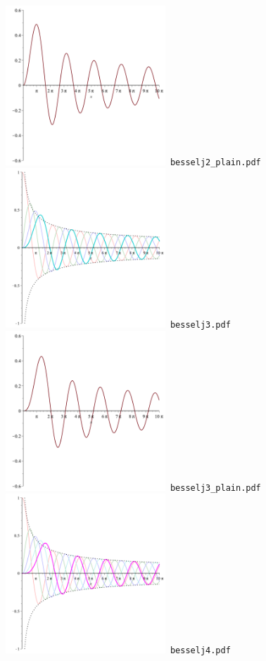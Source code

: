 \documentclass[a4paper]{amsart}
\begin{document}
\includegraphics[width=6cm]{besselj2_plain.pdf}\verb+ besselj2_plain.pdf+\\
\includegraphics[width=6cm]{besselj3.pdf}\verb+ besselj3.pdf+\\
\includegraphics[width=6cm]{besselj3_plain.pdf}\verb+ besselj3_plain.pdf+\\
\includegraphics[width=6cm]{besselj4.pdf}\verb+ besselj4.pdf+\\
\end{document}
